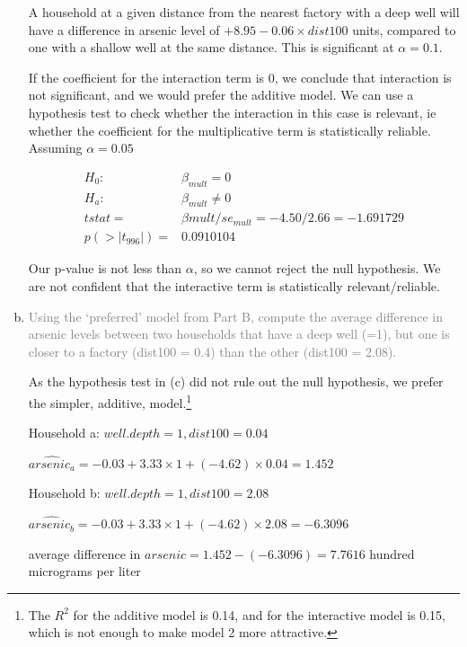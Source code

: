 \documentclass[12pt,letterpaper]{article}
\begin{document}
\begin{enumerate}[(a)]
    A household at a given distance from the nearest factory with a deep well will have a difference in arsenic level of $ + 8.95 - 0.06 \times dist100$ units, compared to one with a shallow well at the same distance.
 This is significant at $\alpha = 0.1$.
    
    If the coefficient for the interaction term is 0, we conclude that interaction is not significant, and we would prefer the additive model.  We can use a hypothesis test to check whether the interaction in this case is relevant, ie whether the coefficient for the multiplicative term is statistically reliable.  Assuming $\alpha = 0.05$
    
    \begin{align*}
      H_0: & \beta_{mult} = 0\\
      H_a: & \beta_{mult} \ne 0\\
      tstat = & \beta{mult} / se_{mult} = -4.50 / 2.66 = -1.691729\\
      p(>|t_{996}|) = & 0.0910104  
    \end{align*}
    
    Our p-value is not less than $\alpha$, so we cannot reject the null hypothesis.
    We are not confident that the interactive term is statistically relevant/reliable.
    
	 


    \item \textcolor{gray}{Using the `preferred' model from Part B, compute the average difference in arsenic
levels between two households that have a deep well (=1), but one is closer to a factory
(dist100 = 0.4) than the other (dist100 = 2.08).  }
    
    As the hypothesis test in (c) did not rule out the null hypothesis, we prefer the simpler, additive, model.\footnote{The $R^2$ for the additive model is 0.14, and for the interactive model is 0.15, which is not enough to make model 2 more attractive.}
    
    Household a: $well.depth = 1, dist100 = 0.04$
 
    $\widehat{arsenic_a} = -0.03 + 3.33 \times 1 + (-4.62) \times 0.04 = 1.452$
 
    Household b: $well.depth = 1, dist100 = 2.08$
 
    $\widehat{arsenic_b} = -0.03 + 3.33 \times 1 + (-4.62) \times 2.08 = -6.3096$
    
    average difference in $arsenic = 1.452 - (-6.3096) = 7.7616$ hundred micrograms per liter

	 

  \end{enumerate}
\end{document}
